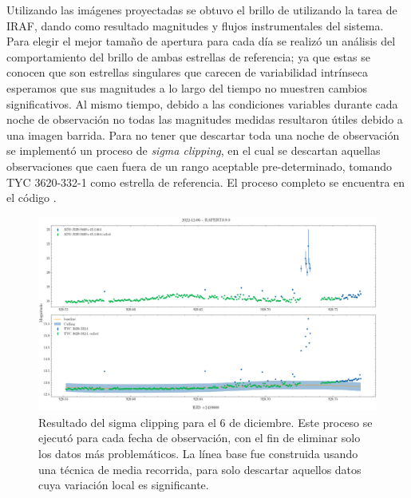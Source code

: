 Utilizando las imágenes proyectadas se obtuvo el brillo de \atoObjId utilizando
la tarea  de IRAF, dando como resultado magnitudes y flujos
instrumentales del sistema. Para elegir el mejor tamaño de apertura para cada
día se realizó un análisis del comportamiento del brillo de ambas estrellas de
referencia; ya que estas se conocen que son estrellas singulares que carecen de
variabilidad intrínseca esperamos que sus magnitudes a lo largo del tiempo no
muestren cambios significativos. Al mismo tiempo, debido a las condiciones
variables durante cada noche de observación no todas las magnitudes medidas
resultaron útiles debido a una imagen barrida. Para no tener que descartar toda
una noche de observación se implementó un proceso de \textit{sigma clipping}, en
el cual se descartan aquellas observaciones que caen fuera de un rango aceptable
pre-determinado, tomando TYC 3620-332-1 como estrella de referencia. El proceso
completo se encuentra en el código
\href{https://github.com/KnightIV/UANL_MAPTA_Observaciones/blob/main/analisis/iturbide/iraf/qphot_sigma_clip.ipynb}{}.

\begin{figure}[!ht]
	\centering
	\includegraphics[scale=0.48]{Observaciones/Secciones/Figures/Sigma Clip.png}
	\caption{Resultado del sigma clipping para el 6 de diciembre. Este proceso
		se ejecutó para cada fecha de observación, con el fin de eliminar solo
		los datos más problemáticos. La línea base fue construida usando una
		técnica de media recorrida, para solo descartar aquellos datos cuya
		variación local es significante.}
	\label{sigmaClipSingleDate}
\end{figure}

